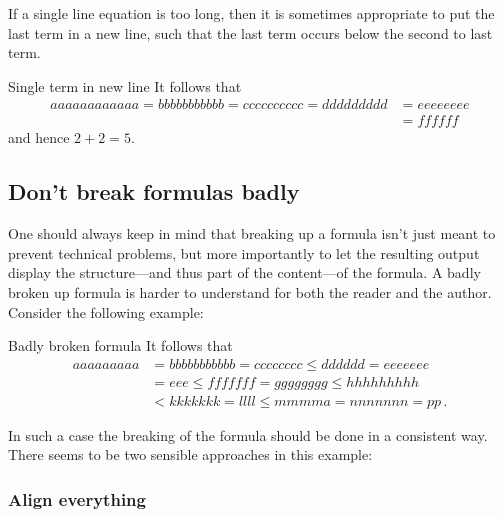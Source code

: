 If a single line equation is too long, then it is sometimes appropriate to put the last term in a new line, such that the last term occurs below the second to last term.
\begin{showlatex}{Single term in new line}
It follows that
\begin{align*}
  aaaaaaaaaaaa
  =
  bbbbbbbbbbb
  =
  cccccccccc
  =
  ddddddddd
  &=
  eeeeeeee
  \\
  &=
  ffffff
\end{align*}
and hence $2 + 2 = 5$.
\end{showlatex}




\subsection{Don’t break formulas badly}

One should always keep in mind that breaking up a formula isn’t just meant to prevent technical problems, but more importantly to let the resulting output display the structure---and thus part of the content---of the formula.
A badly broken up formula is harder to understand for both the reader and the author.
Consider the following example:
\begin{showlatex}{Badly broken formula}
It follows that
\begin{align*}
  aaaaaaaaa
  &=
  bbbbbbbbbbb
  =
  cccccccc
  \leq
  dddddd
  =
  eeeeeee
  \\
  &=
  eee
  \leq
  fffffff
  =
  gggggggg
  \leq
  hhhhhhhhh
  \\
  &<
  kkkkkkk
  =
  llll
  \leq
  mmmma
  =
  nnnnnnn
  =
  pp \,.
\end{align*}
\end{showlatex}
In such a case the breaking of the formula should be done in a consistent way.
There seems to be two sensible approaches in this example:

\subsubsection{Align everything}

